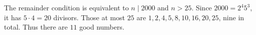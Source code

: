The remainder condition is equivalent to $n\mid2000$ and $n>25$. Since $2000=2^4 5^3$, it has $5\cdot4=20$ divisors. Those at most $25$ are $1,2,4,5,8,10,16,20,25$, nine in total. Thus there are $\boxed{11}$ good numbers.
